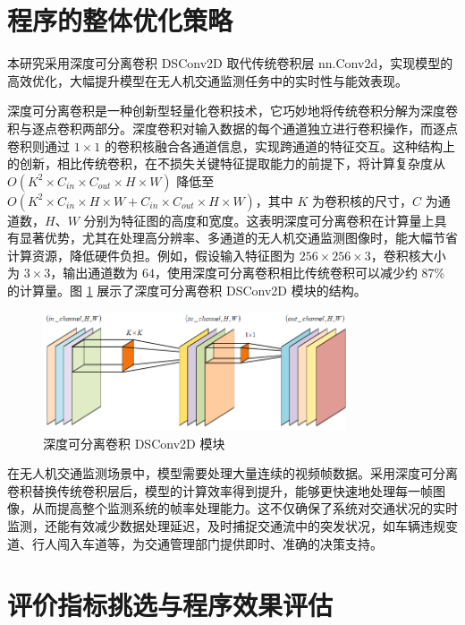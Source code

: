 \documentclass[runningheads]{llncs}
\begin{document}
\section{程序的整体优化策略}

本研究采用深度可分离卷积 DSConv2D 取代传统卷积层 nn.Conv2d，实现模型的高效优化，大幅提升模型在无人机交通监测任务中的实时性与能效表现。

深度可分离卷积是一种创新型轻量化卷积技术，它巧妙地将传统卷积分解为深度卷积与逐点卷积两部分。深度卷积对输入数据的每个通道独立进行卷积操作，而逐点卷积则通过 $1 \times 1$ 的卷积核融合各通道信息，实现跨通道的特征交互。这种结构上的创新，相比传统卷积，在不损失关键特征提取能力的前提下，将计算复杂度从 $O(K^2 \times C_{in} \times C_{out} \times H \times W)$ 降低至 $O(K^2 \times C_{in} \times H \times W + C_{in} \times C_{out} \times H \times W)$，其中 $K$ 为卷积核的尺寸，$C$ 为通道数，$H$、$W$ 分别为特征图的高度和宽度。这表明深度可分离卷积在计算量上具有显著优势，尤其在处理高分辨率、多通道的无人机交通监测图像时，能大幅节省计算资源，降低硬件负担。例如，假设输入特征图为 $256 \times 256 \times 3$，卷积核大小为 $3 \times 3$，输出通道数为 $64$，使用深度可分离卷积相比传统卷积可以减少约 87\% 的计算量。图 \ref{fig:dsconv} 展示了深度可分离卷积 DSConv2D 模块的结构。

\begin{figure}[htbp]
    \centering
    \includegraphics[width=0.8\textwidth]{../figure/DSC.png}
    \caption{深度可分离卷积 DSConv2D 模块}
    \label{fig:dsconv}
\end{figure}

在无人机交通监测场景中，模型需要处理大量连续的视频帧数据。采用深度可分离卷积替换传统卷积层后，模型的计算效率得到提升，能够更快速地处理每一帧图像，从而提高整个监测系统的帧率处理能力。这不仅确保了系统对交通状况的实时监测，还能有效减少数据处理延迟，及时捕捉交通流中的突发状况，如车辆违规变道、行人闯入车道等，为交通管理部门提供即时、准确的决策支持。


\section{评价指标挑选与程序效果评估}
\end{document}
